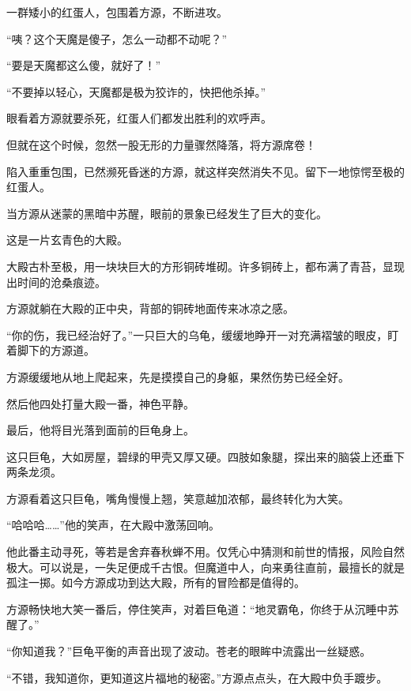 
\begin{this_body}



一群矮小的红蛋人，包围着方源，不断进攻。

“咦？这个天魔是傻子，怎么一动都不动呢？”

“要是天魔都这么傻，就好了！”

“不要掉以轻心，天魔都是极为狡诈的，快把他杀掉。”

眼看着方源就要杀死，红蛋人们都发出胜利的欢呼声。

但就在这个时候，忽然一股无形的力量骤然降落，将方源席卷！

陷入重重包围，已然濒死昏迷的方源，就这样突然消失不见。留下一地惊愕至极的红蛋人。

当方源从迷蒙的黑暗中苏醒，眼前的景象已经发生了巨大的变化。

这是一片玄青色的大殿。

大殿古朴至极，用一块块巨大的方形铜砖堆砌。许多铜砖上，都布满了青苔，显现出时间的沧桑痕迹。

方源就躺在大殿的正中央，背部的铜砖地面传来冰凉之感。

“你的伤，我已经治好了。”一只巨大的乌龟，缓缓地睁开一对充满褶皱的眼皮，盯着脚下的方源道。

方源缓缓地从地上爬起来，先是摸摸自己的身躯，果然伤势已经全好。

然后他四处打量大殿一番，神色平静。

最后，他将目光落到面前的巨龟身上。

这只巨龟，大如房屋，碧绿的甲壳又厚又硬。四肢如象腿，探出来的脑袋上还垂下两条龙须。

方源看着这只巨龟，嘴角慢慢上翘，笑意越加浓郁，最终转化为大笑。

“哈哈哈……”他的笑声，在大殿中激荡回响。

他此番主动寻死，等若是舍弃春秋蝉不用。仅凭心中猜测和前世的情报，风险自然极大。可以说是，一失足便成千古恨。但魔道中人，向来勇往直前，最擅长的就是孤注一掷。如今方源成功到达大殿，所有的冒险都是值得的。

方源畅快地大笑一番后，停住笑声，对着巨龟道：“地灵霸龟，你终于从沉睡中苏醒了。”

“你知道我？”巨龟平衡的声音出现了波动。苍老的眼眸中流露出一丝疑惑。

“不错，我知道你，更知道这片福地的秘密。”方源点点头，在大殿中负手踱步。


\end{this_body}
